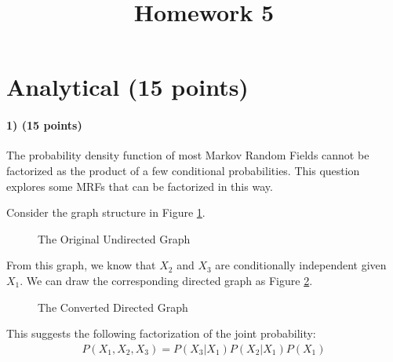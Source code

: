 \documentclass{article}
\newcommand{\ztnodesize}{.6}
\begin{document}
\title{Homework 5}
\maketitle
\thispagestyle{fancy}


\section{Analytical (15 points)}
	
\paragraph{1) (15 points)} The probability density function of most Markov Random Fields cannot be factorized as the product of a few conditional probabilities. This question explores some MRFs that can be factorized in this way.

Consider the graph structure in Figure \ref{fig:utm1}.
\begin{figure}[h]
	\begin{center}
		\caption{The Original Undirected Graph}
			\label{fig:utm1}
		\end{center}
\end{figure}
From this graph, we know that $X_2$ and $X_3$ are conditionally independent given $X_1$. We can draw the corresponding directed graph as Figure \ref{fig:dtm2}.
\begin{figure}[h]
	\begin{center}
		\caption{The Converted Directed Graph}
			\label{fig:dtm2}
		\end{center}
\end{figure}
This suggests the following factorization of the joint probability:
\begin{eqnarray}
P(X_1, X_2, X_3) = P(X_3 | X_1) P(X_2 | X_1) P(X_1) \nonumber
\end{eqnarray}
\end{document}
